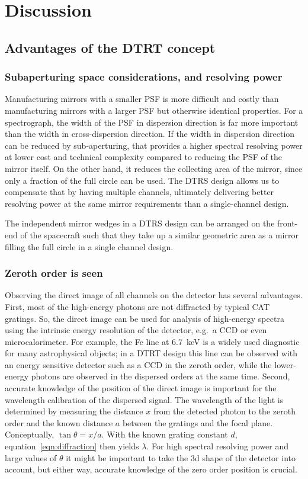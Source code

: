 \documentclass[linenumbers]{aastex631}
\begin{document}
\section{Discussion}
\label{sect:discussion}

\subsection{Advantages of the DTRT concept}
\subsubsection{Subaperturing space considerations, and resolving power}
Manufacturing mirrors with a smaller PSF is more difficult and costly than manufacturing mirrors with a larger PSF but otherwise identical properties. For a spectrograph, the width of the PSF in dispersion direction is far more important than the width in cross-dispersion direction. If the width in dispersion direction can be reduced by sub-aperturing, that provides a higher spectral resolving power at lower cost and technical complexity compared to reducing the PSF of the mirror itself. On the other hand, it reduces the collecting area of the mirror, since only a fraction of the full circle can be used. The DTRS design allows us to compensate that by having multiple channels, ultimately delivering better resolving power at the same mirror requirements than a single-channel design.

The independent mirror wedges in a DTRS design can be arranged on the front-end of the spacecraft such that they take up a similar geometric area as a mirror filling the full circle in a single channel design.

\subsubsection{Zeroth order is seen}
Observing the direct image of all channels on the detector has several advantages. First, most of the high-energy photons are not diffracted by typical CAT gratings. So, the direct image can be used for analysis of high-energy spectra using the intrinsic energy resolution of the detector, e.g.\ a CCD or even microcalorimeter. For example, the Fe line at 6.7~keV is a widely used diagnostic for many astrophysical objects; in a DTRT design this line can be observed with an energy sensitive detector such as a CCD in the zeroth order, while the lower-energy photons are observed in the dispersed orders at the same time. Second, accurate knowledge of the position of the direct image is important for the wavelength calibration of the dispersed signal. The wavelength of the light is determined by measuring the distance $x$ from the detected photon to the zeroth order and the known distance $a$ between the gratings and the focal plane. Conceptually, $\tan \theta = x/a$. With the known grating constant $d$, equation~\ref{eqn:diffraction} then yields $\lambda$. For high spectral resolving power and large values of $\theta$ it might be important to take the 3d shape of the detector into account, but either way, accurate knowledge of the zero order position is crucial.
\end{document}
